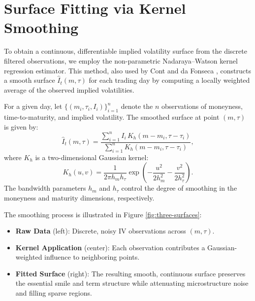 \documentclass[a4paper,12pt]{report}
\begin{document}
\section{Surface Fitting via Kernel Smoothing}
\label{sec:surface-fitting}

To obtain a continuous, differentiable implied volatility surface from the discrete filtered observations, we employ the non-parametric Nadaraya–Watson kernel regression estimator. This method, also used by Cont and da Fonseca \cite{cont2002}, constructs a smooth surface $\hat{I}_t(m, \tau)$ for each trading day by computing a locally weighted average of the observed implied volatilities.

For a given day, let $\{(m_i, \tau_i, I_i)\}_{i=1}^n$ denote the $n$ observations of moneyness, time-to-maturity, and implied volatility. The smoothed surface at point $(m, \tau)$ is given by:
\[
\hat{I}_t(m, \tau) = \frac{\sum_{i=1}^n I_i \, K_h(m - m_i, \tau - \tau_i)}{\sum_{i=1}^n K_h(m - m_i, \tau - \tau_i)},
\]
where $K_h$ is a two-dimensional Gaussian kernel:
\[
K_h(u, v) = \frac{1}{2\pi h_m h_\tau} \exp\left(-\frac{u^2}{2h_m^2} - \frac{v^2}{2h_\tau^2}\right).
\]
The bandwidth parameters $h_m$ and $h_\tau$ control the degree of smoothing in the moneyness and maturity dimensions, respectively.

The smoothing process is illustrated in Figure \ref{fig:three-surfaces}:
\begin{itemize}
    \item \textbf{Raw Data} (left): Discrete, noisy IV observations across $(m, \tau)$.
    \item \textbf{Kernel Application} (center): Each observation contributes a Gaussian-weighted influence to neighboring points.
    \item \textbf{Fitted Surface} (right): The resulting smooth, continuous surface preserves the essential smile and term structure while attenuating microstructure noise and filling sparse regions.
\end{itemize}
\end{document}
